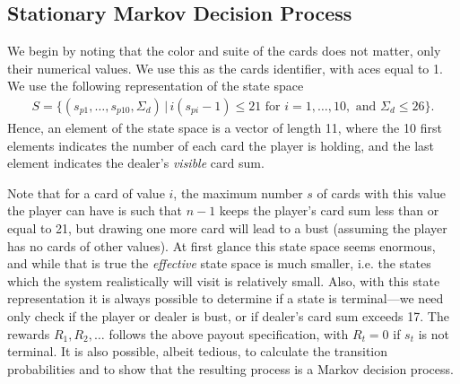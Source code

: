 \subsection{Stationary Markov Decision Process} \label{sec:stationaryMDP}
We begin by noting that the color and suite of the cards does not matter, only their numerical values. We use this as the cards identifier, with aces equal to 1. We use the following representation of the state space
\begin{align*}
	S = \{  (s_{p1},\ldots,s_{p10},\Sigma_{d}) \, | \, i (s_{pi} - 1) \leq 21 \text { for }i=1,\ldots,10, \text{ and } \Sigma_{d} \leq 26 \}.
\end{align*}
Hence, an element of the state space is a vector of length 11, where the 10 first elements indicates the number of each card the player is holding, 
and the last element indicates the dealer's \emph{visible} card sum.

Note that for a card of value $i$, the maximum number $s$ of cards with this value the player can have is such that $n-1$ keeps the player's card sum less than or equal to 21,
but drawing one more card will lead to a bust (assuming the player has no cards of other values). At first glance this state space seems enormous, 
and while that is true the \textit{effective} state space is much smaller, i.e. the states which the system realistically will visit is relatively small.  
Also, with this state representation it is always possible to determine if a state is terminal---we need only check if the player or dealer is bust, or if dealer's card sum 
exceeds 17. The rewards $R_1,R_2,\ldots$ follows the above payout specification, with $R_t = 0$ if $s_t$ is not terminal.
It is also possible, albeit tedious, to calculate the transition probabilities and to show that the resulting process is a Markov decision process.

